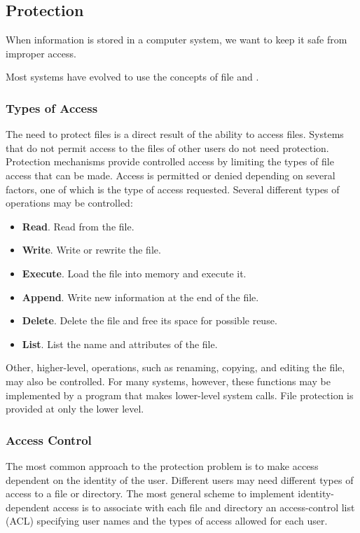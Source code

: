 \subsection{Protection}\label{subsec:File_Protection}
When information is stored in a computer system, we want to keep it safe from improper access.

Most systems have evolved to use the concepts of file  and .

\subsubsection{Types of Access}\label{subsubsec:Types_File_Access}
The need to protect files is a direct result of the ability to access files.
Systems that do not permit access to the files of other users do not need protection.
Protection mechanisms provide controlled access by limiting the types of file access that can be made.
Access is permitted or denied depending on several factors, one of which is the type of access requested.
Several different types of operations may be controlled:
\begin{itemize}[noitemsep]
\item \textbf{Read}.
 Read from the file.
\item \textbf{Write}.
 Write or rewrite the file.
\item \textbf{Execute}.
 Load the file into memory and execute it.
\item \textbf{Append}.
 Write new information at the end of the file.
\item \textbf{Delete}.
 Delete the file and free its space for possible reuse.
\item \textbf{List}.
 List the name and attributes of the file.
\end{itemize}

Other, higher-level, operations, such as renaming, copying, and editing the file, may also be controlled.
For many systems, however, these functions may be implemented by a program that makes lower-level system calls.
File protection is provided at only the lower level.

\subsubsection{Access Control}\label{subsubsec:Access_Control}
The most common approach to the protection problem is to make access dependent on the identity of the user.
Different users may need different types of access to a file or directory.
The most general scheme to implement identity-dependent access is to associate with each file and directory an access-control list (ACL) specifying user names and the types of access allowed for each user.

